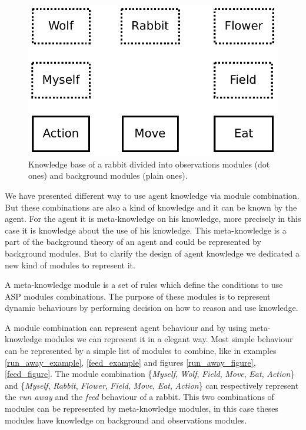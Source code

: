 \documentclass{aamas2012}
\begin{document}
	\begin{figure}
		\centering
		\includegraphics[keepaspectratio=true, scale=0.4]{module_combination.pdf}
		\caption
		{
			\label{module_combination}
			Knowledge base of a rabbit divided into observations modules (dot ones) and background modules (plain ones).
		}
	\end{figure}

	We have presented different way to use agent knowledge via module combination.
	But these combinations are also a kind of knowledge and it can be known by the agent.
	For the agent it is meta-knowledge on his knowledge, more precisely in this case it is knowledge about the use of his knowledge.
	This meta-knowledge is a part of the background theory of an agent and could be represented by background modules.
	But to clarify the design of agent knowledge we dedicated a new kind of modules to represent it.

	\begin{definition}
		A meta-knowledge module is a set of rules which define the conditions to use ASP modules combinations.	
		The purpose of these modules is to represent dynamic behaviours by performing decision on how to reason and use knowledge.
	\end{definition}
	
	A module combination can represent agent behaviour and by using meta-knowledge modules we can represent it in a elegant way.
	Most simple behaviour can be represented by a simple list of modules to combine, like in examples \ref{run_away_example}, 
	\ref{feed_example} and figures \ref{run_away_figure}, \ref{feed_figure}.
	The module combination \{\emph{Myself}, \emph{Wolf}, \emph{Field}, \emph{Move}, \emph{Eat}, \emph{Action}\} 
	and \{\emph{Myself}, \emph{Rabbit}, \emph{Flower}, \emph{Field},  \emph{Move}, \emph{Eat}, \emph{Action}\} 
	can respectively represent the \textit{run away} and the \textit{feed} behaviour of a rabbit.
	This two combinations of modules can be represented by meta-knowledge modules, in this case theses modules have knowledge on background and observations modules.
	
\end{document}
